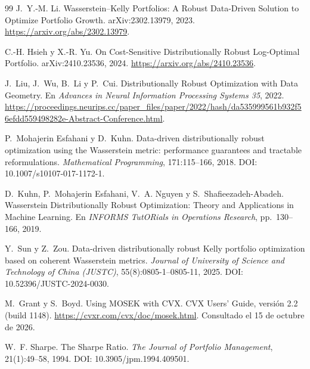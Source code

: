 \documentclass[11pt]{article}
\begin{document}
\begin{thebibliography}{99}
J.~Y.-M. Li.
\newblock Wasserstein--Kelly Portfolios: A Robust Data-Driven Solution to
  Optimize Portfolio Growth.
\newblock arXiv:2302.13979, 2023.
\newblock \url{https://arxiv.org/abs/2302.13979}.

C.-H. Hsieh y X.-R. Yu.
\newblock On Cost-Sensitive Distributionally Robust Log-Optimal Portfolio.
\newblock arXiv:2410.23536, 2024.
\newblock \url{https://arxiv.org/abs/2410.23536}.

J.~Liu, J.~Wu, B.~Li y P.~Cui.
\newblock Distributionally Robust Optimization with Data Geometry.
\newblock En \emph{Advances in Neural Information Processing Systems 35},
2022.
\newblock \url{https://proceedings.neurips.cc/paper_files/paper/2022/hash/da535999561b932f56efdd559498282e-Abstract-Conference.html}.

 P.~Mohajerin Esfahani y D.~Kuhn.
\newblock Data-driven distributionally robust optimization using the
   Wasserstein metric: performance guarantees and tractable reformulations.
\newblock \emph{Mathematical Programming}, 171:115--166, 2018.
\newblock DOI: 10.1007/s10107-017-1172-1.

 D.~Kuhn, P.~Mohajerin Esfahani, V.~A. Nguyen y S.~Shafieezadeh-Abadeh.
 \newblock Wasserstein Distributionally Robust Optimization: Theory and
  Applications in Machine Learning.
\newblock En \emph{INFORMS TutORials in Operations Research}, pp.~130--166, 2019.


Y.~Sun y Z.~Zou.
\newblock Data-driven distributionally robust Kelly portfolio optimization
  based on coherent Wasserstein metrics.
\newblock \emph{Journal of University of Science and Technology of China
  (JUSTC)}, 55(8):0805-1--0805-11, 2025.
\newblock DOI: 10.52396/JUSTC-2024-0030.

 M.~Grant y S.~Boyd.
 \newblock Using MOSEK with CVX.
 \newblock CVX Users' Guide, versión 2.2 (build 1148). 
 \url{https://cvxr.com/cvx/doc/mosek.html}.
\newblock Consultado el 15 de octubre de 2026.

W.~F. Sharpe.
\newblock The Sharpe Ratio.
\newblock \emph{The Journal of Portfolio Management}, 21(1):49--58, 1994.
\newblock DOI: 10.3905/jpm.1994.409501.


\end{thebibliography}
\end{document}
